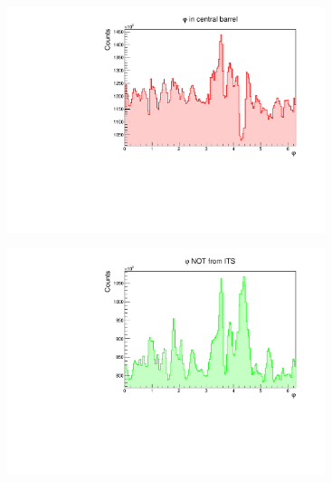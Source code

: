 \documentclass[10pt]{beamer}
\begin{document}
\begin{frame}
\begin{columns}
\begin{column}{0.5\textwidth}
\begin{figure}
\begin{center}
                \end{center}
            \end{figure}
        \end{column}
        \begin{column}{0.5\textwidth}
            \vspace*{-0.43cm}
            \begin{figure}
                \begin{center}
                    \includegraphics[width=0.95\textwidth]{Plots/pass4_TracksIU_nohasITS/phi.pdf}
                \end{center}
            \end{figure}
            \vspace*{-0.6cm}
            \begin{figure}
                \begin{center}
                    \includegraphics[width=0.95\textwidth]{Plots/phi_no_ITS.pdf}
                \end{center}
            \end{figure}
        \end{column}
    \end{columns}

\end{frame}
\end{document}
